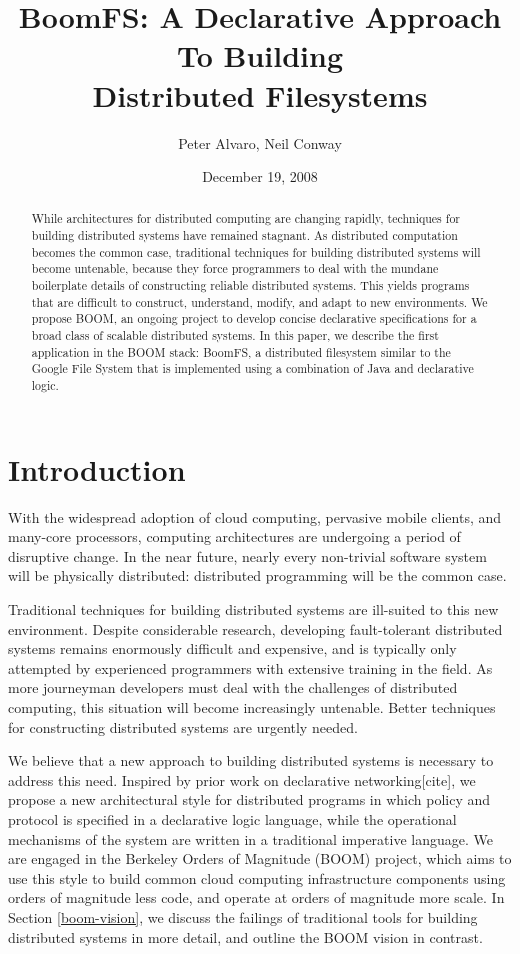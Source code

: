 \documentclass{article}
\title{BoomFS: A Declarative Approach To Building\\Distributed Filesystems}
\author{Peter Alvaro, Neil Conway}
\date{December 19, 2008}
\begin{document}
\maketitle
\begin{abstract}
  While architectures for distributed computing are changing rapidly,
  techniques for building distributed systems have remained
  stagnant. As distributed computation becomes the common case,
  traditional techniques for building distributed systems will become
  untenable, because they force programmers to deal with the mundane
  boilerplate details of constructing reliable distributed
  systems. This yields programs that are difficult to construct,
  understand, modify, and adapt to new environments. We propose BOOM,
  an ongoing project to develop concise declarative specifications for
  a broad class of scalable distributed systems. In this paper, we
  describe the first application in the BOOM stack: BoomFS, a
  distributed filesystem similar to the Google File System\cite{gfs}
  that is implemented using a combination of Java and declarative
  logic.
\end{abstract}
\section{Introduction}
\label{introduction}
With the widespread adoption of cloud computing, pervasive mobile
clients, and many-core processors, computing architectures are
undergoing a period of disruptive change. In the near future, nearly
every non-trivial software system will be physically distributed:
distributed programming will be the common case.

Traditional techniques for building distributed systems are ill-suited
to this new environment. Despite considerable research, developing
fault-tolerant distributed systems remains enormously difficult and
expensive, and is typically only attempted by experienced programmers
with extensive training in the field. As more journeyman developers
must deal with the challenges of distributed computing, this situation
will become increasingly untenable. Better techniques for constructing
distributed systems are urgently needed.

We believe that a new approach to building distributed systems is
necessary to address this need. Inspired by prior work on declarative
networking[cite], we propose a new architectural style for distributed
programs in which policy and protocol is specified in a declarative
logic language, while the operational mechanisms of the system are
written in a traditional imperative language. We are engaged in the
Berkeley Orders of Magnitude (BOOM) project, which aims to use this
style to build common cloud computing infrastructure components using
orders of magnitude less code, and operate at orders of magnitude more
scale. In Section \ref{boom-vision}, we discuss the failings of
traditional tools for building distributed systems in more detail, and
outline the BOOM vision in contrast.
\end{document}
